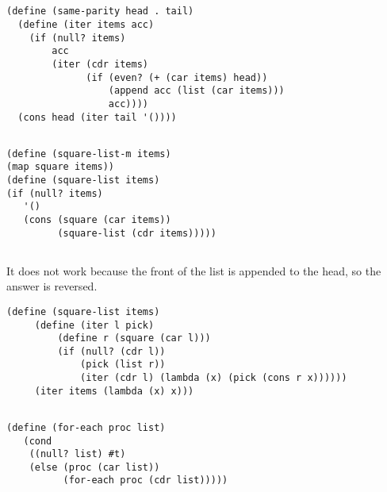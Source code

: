 \documentclass{article}
\begin{document}
\subsection{}
\begin{verbatim}
(define (same-parity head . tail)
  (define (iter items acc)
    (if (null? items)
        acc
        (iter (cdr items)
              (if (even? (+ (car items) head))
                  (append acc (list (car items)))
                  acc))))
  (cons head (iter tail '())))
\end{verbatim}

\subsection{}
\begin{verbatim}
(define (square-list-m items) 
(map square items)) 
(define (square-list items) 
(if (null? items) 
   '() 
   (cons (square (car items)) 
         (square-list (cdr items))))) 
\end{verbatim}

\subsection{}
It does not work because the front of the list is appended to the head, so the answer is reversed.
\begin{verbatim}
(define (square-list items) 
     (define (iter l pick) 
         (define r (square (car l))) 
         (if (null? (cdr l)) 
             (pick (list r)) 
             (iter (cdr l) (lambda (x) (pick (cons r x)))))) 
     (iter items (lambda (x) x))) 
\end{verbatim}

\subsection{}
\begin{verbatim}
(define (for-each proc list) 
   (cond 
    ((null? list) #t) 
    (else (proc (car list)) 
          (for-each proc (cdr list))))) 
\end{verbatim}
\end{document}
